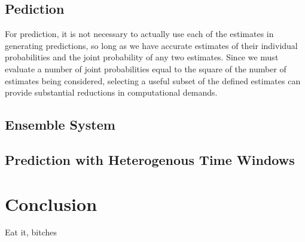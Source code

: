 \documentclass[10pt]{article}
\begin{document}
\subsection{Pediction}
For prediction, it is not necessary to actually use each of the estimates in generating predictions, so long as we have accurate estimates of their individual probabilities and the joint probability of any two estimates.  Since we must evaluate a number of joint probabilities equal to the square of the number of estimates being considered, selecting a useful subset of the defined estimates can provide substantial reductions in computational demands.


\subsection{Ensemble System}



\subsection{Prediction with Heterogenous Time Windows}

\section{Conclusion}
Eat it, bitches
\end{document}

